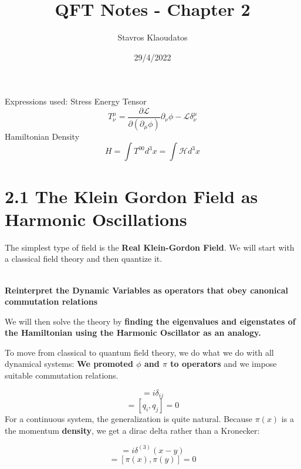 \documentclass{article}
\title{QFT Notes - Chapter 2}
\author{Stavros Klaoudatos}
\date{29/4/2022}
\newcommand{\bb}[1]{\begin{tcolorbox}
  \textbf{#1}
\end{tcolorbox}}
\begin{document}
\maketitle
\tableofcontents
\listoffigures

Expressions used:
Stress Energy Tensor
\begin{equation*}
    T^\mu_\nu = \frac{\partial \mathcal{L}}{\partial(\partial_\mu \phi)}\partial_\nu \phi - \mathcal{L}\delta^\mu_\nu
\end{equation*}
Hamiltonian Density
\begin{equation*}
    H = \int T^{00} d^3x = \int \mathcal{H}d^3 x
\end{equation*}

\section{2.1 The Klein Gordon Field as Harmonic Oscillations}

The simplest type of field is the \textbf{Real Klein-Gordon Field}. We will start with a classical field theory and then quantize it. 
\bb{
\\
Reinterpret the Dynamic Variables as operators that obey canonical commutation relations}

We will then solve the theory by \textbf{finding the eigenvalues and eigenstates of the Hamiltonian using the Harmonic Oscillator as an analogy.}

To move from classical to quantum field theory, we do what we do with all dynamical systems: \textbf{We promoted $\phi$ and $\pi$ to operators} and we impose suitable commutation relations.

\begin{equation}
    [q_i,p_j] = i \delta_{ij}
\end{equation}
\begin{equation}
    [p_i,p_j] = [q_i,q_j]=0
\end{equation}
 For a continuous system, the generalization is quite natural. Because $\pi(x)$ is a the momentum \textbf{density}, we get a dirac delta rather than a Kronecker:
 
 \begin{equation}
     [\phi(x),\pi(y)] = i\delta^{(3)}(x-y)
 \end{equation}
 \begin{equation}
     [\phi(x),\phi(y)] = [\pi(x),\pi(y)] = 0
 \end{equation}
 
\end{document}
